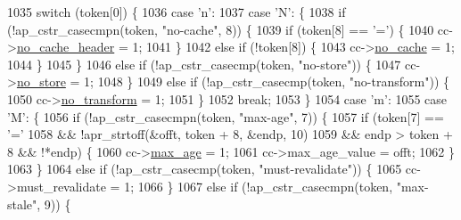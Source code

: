 \begin{DoxyCode}
1035             \textcolor{keywordflow}{switch} (token[0]) \{
1036             \textcolor{keywordflow}{case} \textcolor{charliteral}{'n'}:
1037             \textcolor{keywordflow}{case} \textcolor{charliteral}{'N'}: \{
1038                 \textcolor{keywordflow}{if} (!ap\_cstr\_casecmpn(token, \textcolor{stringliteral}{"no-cache"}, 8)) \{
1039                     \textcolor{keywordflow}{if} (token[8] == \textcolor{charliteral}{'='}) \{
1040                         cc->\hyperlink{structcache__control_a5666e10bbcfd50789d1c9e629a3620ca}{no\_cache\_header} = 1;
1041                     \}
1042                     \textcolor{keywordflow}{else} \textcolor{keywordflow}{if} (!token[8]) \{
1043                         cc->\hyperlink{structcache__control_a76e5095344c47d185ef638ba1b66f267}{no\_cache} = 1;
1044                     \}
1045                 \}
1046                 \textcolor{keywordflow}{else} \textcolor{keywordflow}{if} (!ap\_cstr\_casecmp(token, \textcolor{stringliteral}{"no-store"})) \{
1047                     cc->\hyperlink{structcache__control_a954d604960ef369d164db15b4574f5e2}{no\_store} = 1;
1048                 \}
1049                 \textcolor{keywordflow}{else} \textcolor{keywordflow}{if} (!ap\_cstr\_casecmp(token, \textcolor{stringliteral}{"no-transform"})) \{
1050                     cc->\hyperlink{structcache__control_a9dd9fb1552e6dc7b8ede2aa67311abe0}{no\_transform} = 1;
1051                 \}
1052                 \textcolor{keywordflow}{break};
1053             \}
1054             \textcolor{keywordflow}{case} \textcolor{charliteral}{'m'}:
1055             \textcolor{keywordflow}{case} \textcolor{charliteral}{'M'}: \{
1056                 \textcolor{keywordflow}{if} (!ap\_cstr\_casecmpn(token, \textcolor{stringliteral}{"max-age"}, 7)) \{
1057                     \textcolor{keywordflow}{if} (token[7] == \textcolor{charliteral}{'='}
1058                             && !apr\_strtoff(&offt, token + 8, &endp, 10)
1059                             && endp > token + 8 && !*endp) \{
1060                         cc->\hyperlink{structcache__control_a8763519de9a2fa97d625e3f0bcf4efde}{max\_age} = 1;
1061                         cc->max\_age\_value = offt;
1062                     \}
1063                 \}
1064                 \textcolor{keywordflow}{else} \textcolor{keywordflow}{if} (!ap\_cstr\_casecmp(token, \textcolor{stringliteral}{"must-revalidate"})) \{
1065                     cc->must\_revalidate = 1;
1066                 \}
1067                 \textcolor{keywordflow}{else} \textcolor{keywordflow}{if} (!ap\_cstr\_casecmpn(token, \textcolor{stringliteral}{"max-stale"}, 9)) \{

\end{DoxyCode}
